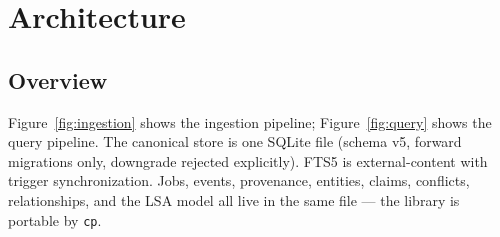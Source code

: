 
\needspace{0.2\textheight}
\section{Architecture}\label{sec:architecture}

\subsection{Overview}\label{sec:overview}

Figure~\ref{fig:ingestion} shows the ingestion pipeline; Figure~\ref{fig:query}
shows the query pipeline. The canonical store is one SQLite file (schema v5,
forward migrations only, downgrade rejected explicitly). FTS5 is
external-content with trigger synchronization. Jobs, events, provenance,
entities, claims, conflicts, relationships, and the LSA model all live in the
same file --- the library is portable by \texttt{cp}.

